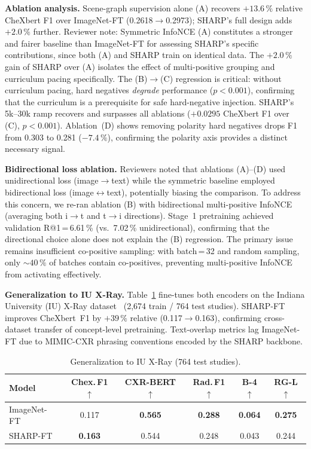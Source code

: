 \documentclass[runningheads]{llncs}
\begin{document}
\noindent\textbf{Ablation analysis.}
Scene-graph supervision alone (A) recovers $+13.6\,\%$ relative CheXbert F1
over ImageNet-FT (0.2618$\to$0.2973); SHARP's full design adds $+2.0\,\%$
further.
Reviewer note: Symmetric InfoNCE (A) constitutes a stronger and fairer
baseline than ImageNet-FT for assessing SHARP's specific contributions,
since both (A) and SHARP train on identical data.
The $+2.0\,\%$ gain of SHARP over (A) isolates the effect of multi-positive
grouping and curriculum pacing specifically.
The (B)$\to$(C) regression is critical: without curriculum pacing, hard
negatives \emph{degrade} performance ($p{<}0.001$), confirming that the
curriculum is a prerequisite for safe hard-negative injection.
SHARP's 5k--30k ramp recovers and surpasses all ablations
($+0.0295$ CheXbert F1 over (C), $p{<}0.001$).
Ablation~(D) shows removing polarity hard negatives drops F1 from 0.303
to 0.281 ($-7.4\,\%$), confirming the polarity axis provides a distinct
necessary signal.

\noindent\textbf{Bidirectional loss ablation.}
Reviewers noted that ablations (A)--(D) used unidirectional loss (image$\to$text)
while the symmetric baseline employed bidirectional loss (image$\leftrightarrow$text),
potentially biasing the comparison.
To address this concern, we re-ran ablation (B) with bidirectional
multi-positive InfoNCE (averaging both i$\to$t and t$\to$i directions).
Stage~1 pretraining achieved validation R@1\,=\,6.61\,\%
(vs.\ 7.02\,\% unidirectional), confirming that the directional choice
alone does not explain the (B) regression.
The primary issue remains insufficient co-positive sampling: with batch\,=\,32
and random sampling, only ${\sim}40\,\%$ of batches contain co-positives,
preventing multi-positive InfoNCE from activating effectively.

\noindent\textbf{Generalization to IU X-Ray.}
Table~\ref{tab:iu} fine-tunes both encoders on the Indiana University (IU)
X-Ray dataset~\cite{iuxray} (2{,}674 train / 764 test studies).
SHARP-FT improves CheXbert~F1 by $+39\,\%$ relative (0.117$\to$0.163),
confirming cross-dataset transfer of concept-level pretraining.
Text-overlap metrics lag ImageNet-FT due to MIMIC-CXR phrasing
conventions encoded by the SHARP backbone.

\begin{table}[t]
\centering
\caption{Generalization to IU X-Ray (764 test studies).}
\label{tab:iu}
{\small\setlength{\tabcolsep}{5pt}%
\begin{tabular}{lccccc}
\toprule
\textbf{Model} & \textbf{Chex.\,F1}$\uparrow$ & \textbf{CXR-BERT}$\uparrow$
  & \textbf{Rad.\,F1}$\uparrow$ & \textbf{B-4}$\uparrow$ & \textbf{RG-L}$\uparrow$ \\
\midrule
ImageNet-FT & 0.117 & \textbf{0.565} & \textbf{0.288} & \textbf{0.064} & \textbf{0.275} \\
SHARP-FT    & \textbf{0.163} & 0.544 & 0.248 & 0.043 & 0.244 \\
\bottomrule
\end{tabular}}
\end{table}
\end{document}
